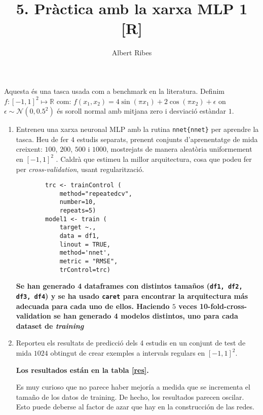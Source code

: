 \documentclass[a4paper]{article}
\author{Albert Ribes}
\title{\textbf{5. Pràctica amb la xarxa MLP 1 [R]}}
\begin{document}
    \maketitle

    Aquesta és una tasca usada com a benchmark en la literatura. Definim
    $f:
    [-1, 1]^2
    \longmapsto
    \mathbb{R} $
    com:
    $f(x_1, x_2) =
    4\sin(\pi x_1) +
    2\cos(\pi x_2 ) +
    \epsilon$
    on
    $\epsilon \sim \mathcal{N}(0, 0.5^2)$
    és soroll normal amb mitjana zero i desviació estàndar
    $1$.

    \begin{enumerate}

        \item Entreneu una xarxa neuronal MLP amb la rutina
        \texttt{nnet\{nnet\}}
        per aprendre la tasca. Heu de fer $4$
        estudis separats, prenent conjunts d'aprenentatge de mida creixent:
            $100$, $200$, $500$ i $1000$, mostrejats
        de manera aleatòria uniformement en
        $[-1, 1]^2$ .
        Caldrà que estimeu la millor arquitectura, cosa que
        podeu fer per \textit{cross-validation}, usant regularització.

        \begin{lstlisting}
        trc <- trainControl (
            method="repeatedcv",
            number=10,
            repeats=5)
        model1 <- train (
            target ~.,
            data = df1,
            linout = TRUE,
            method='nnet',
            metric = "RMSE",
            trControl=trc)
        \end{lstlisting}

        {\bfseries
        Se han generado 4 dataframes con distintos tamaños (\texttt{df1, df2, df3, df4}) y se ha usado \texttt{caret} para encontrar la arquitectura más adecuada para cada uno de ellos. Haciendo $5$ veces 10-fold-cross-validation se han generado 4 modelos distintos, uno para cada dataset de \textit{training}
        }

        \item Reporteu els resultats de predicció dels 4 estudis en un conjunt de test de mida $1024$
        obtingut de
        crear exemples a intervals regulars en
        $[-1, 1]^2$.

        {\bfseries
        Los resultados están en la tabla \ref{res}.

        Es muy curioso que no parece haber mejoría a medida que se incrementa el tamaño de los datos de training. De hecho, los resultados parecen oscilar. Esto puede deberse al factor de azar que hay en la construcción de las redes.

}
\end{enumerate}
\end{document}
